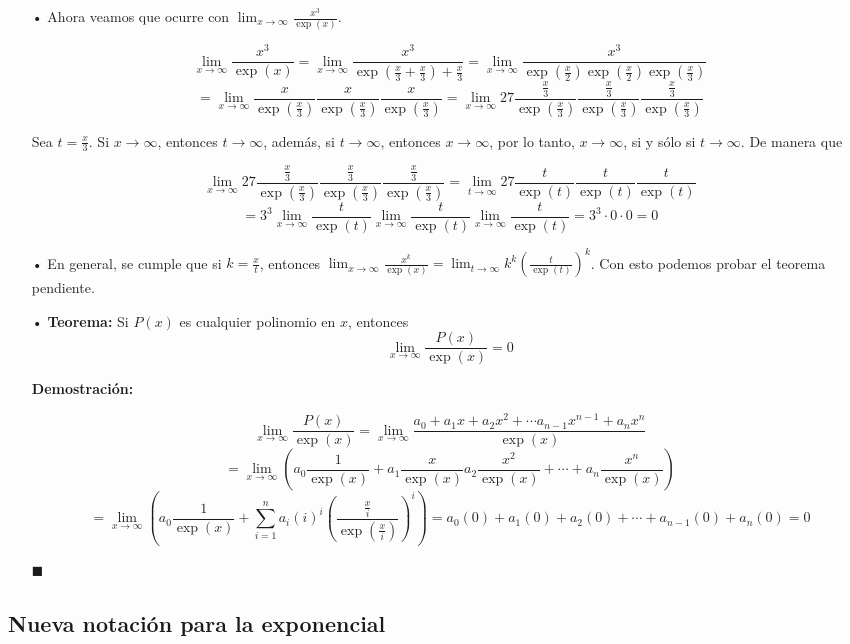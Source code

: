 \documentclass[pts12]{article}
\numberwithin{equation}{section}
\newcommand{\Col}{\color{ProcessBlue}}
\newcommand{\limf}[1]{\lim_{#1\to\infty}}
\newcommand{\suma}[3]{\sum_{#1}^{#2}{#3}}
\begin{document}
\begin{itemize}
\item[\Col •] Ahora veamos que ocurre con $\lim_{x\to\infty}\frac{x^3}{\exp(x)}$.

$$ \lim_{x\to\infty}\frac{x^3}{\exp(x)}=\lim_{x\to\infty}\frac{x^3}{\exp(\frac{x}{3}+\frac{x}{3})+\frac{x}{3}}=\lim_{x\to\infty}\frac{x^3}{\exp(\frac{x}{2})\exp(\frac{x}{2})\exp(\frac{x}{3})}$$
$$=\lim_{x\to\infty}\frac{x}{\exp(\frac{x}{3})}\frac{x}{\exp(\frac{x}{3})}\frac{x}{\exp(\frac{x}{3})}=\lim_{x\to\infty}27\frac{\frac{x}{3}}{\exp(\frac{x}{3})}\frac{\frac{x}{3}}{\exp(\frac{x}{3})}\frac{\frac{x}{3}}{\exp(\frac{x}{3})} $$

Sea $t=\frac{x}{3}$. Si $x\to \infty$, entonces $t\to \infty$, además, si $t\to \infty$, entonces $x\to \infty$, por lo tanto, $x\to \infty$, si y sólo si $t\to \infty$. De manera que

$$ \lim_{x\to\infty}27\frac{\frac{x}{3}}{\exp(\frac{x}{3})}\frac{\frac{x}{3}}{\exp(\frac{x}{3})}\frac{\frac{x}{3}}{\exp(\frac{x}{3})}=\lim_{t\to\infty}27\frac{t}{\exp(t)}\frac{t}{\exp(t)}\frac{t}{\exp(t)}$$
$$=3^3\lim_{x\to\infty}\frac{t}{\exp(t)}\lim_{x\to\infty}\frac{t}{\exp(t)}\lim_{x\to\infty}\frac{t}{\exp(t)}=3^3\cdot 0\cdot 0=0 $$

\item[\Col •] En general, se cumple que si $k=\frac{x}{t}$, entonces $\lim_{x\to\infty}\frac{x^k}{\exp(x)}=\lim_{t\to\infty}k^k\left(\frac{t}{\exp(t)}\right)^k$. Con esto podemos probar el teorema pendiente.

\item[\Col •] \textbf{Teorema:} Si $P(x)$ es cualquier polinomio en $x$, entonces 
$$ \lim_{x\to\infty}\frac{P(x)}{\exp(x)}=0 $$

\textbf{Demostración:} 

$$ \limf{x}\frac{P(x)}{\exp(x)}=\limf{x}\frac{a_0+a_1x+a_2x^2+\cdots a_{n-1}x^{n-1}+a_nx^n}{\exp(x)} $$
$$ =\limf{x}\left( a_0\frac{1}{\exp(x)}+a_1\frac{x}{\exp(x)} a_2\frac{x^2}{\exp(x)}+\cdots+a_n\frac{x^n}{\exp(x)} \right)$$
$$=\limf{x}\left( a_0\frac{1}{\exp(x)}+\suma{i=1}{n}{a_i(i)^{i}\left(\frac{\frac{x}{i}}{\exp(\frac{x}{i})}\right)^{i}} \right)=a_0(0)+a_1(0)+a_2(0)+\cdots+a_{n-1}(0)+a_n(0)=0 $$

\begin{flushright}
$\blacksquare$
\end{flushright}

\end{itemize}

\subsection{\Col Nueva notación para la exponencial}
\end{document}
